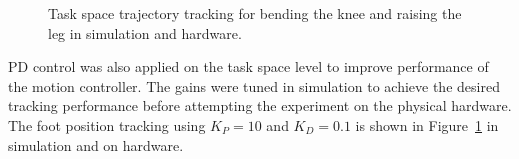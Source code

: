 \begin{figure}[!b]
	\begin{center}
	\end{center}
  	\caption{Task space trajectory tracking for bending the knee and raising the leg in simulation and hardware.}
	\label{fig:kneebendp}
\end{figure} 

PD control was also applied on the task space level to improve performance of the motion controller. The gains were tuned in simulation to achieve the desired tracking performance before attempting the experiment on the physical hardware. The foot position tracking using $K_P = 10$ and $K_D = 0.1$ is shown in Figure~\ref{fig:kneebendp} in simulation and on hardware. 


